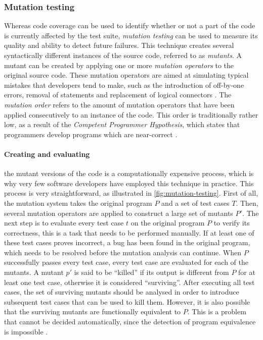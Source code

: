 \subsubsection{Mutation testing}
Whereas code coverage can be used to identify whether or not a part of the code is currently affected by the test suite, \emph{mutation testing} can be used to measure its quality and ability to detect future failures. This technique creates several syntactically different instances of the source code, referred to as \emph{mutants}. A mutant can be created by applying one or more \emph{mutation operators} to the original source code. These mutation operators are aimed at simulating typical mistakes that developers tend to make, such as the introduction of off-by-one errors, removal of statements and replacement of logical connectors \cite{Offutt2001}. The \emph{mutation order} refers to the amount of mutation operators that have been applied consecutively to an instance of the code. This order is traditionally rather low, as a result of the \emph{Competent Programmer Hypothesis}, which states that programmers develop programs which are near-correct \cite{5487526}.

\paragraph*{Creating and evaluating} the mutant versions of the code is a computationally expensive process, which is why very few software developers have employed this technique in practice. This process is very straightforward, as illustrated in \autoref{fig:mutation-testing}. First of all, the mutation system takes the original program $P$ and a set of test cases $T$. Then, several mutation operators are applied to construct a large set of mutants $P'$. The next step is to evaluate every test case $t$ on the original program $P$ to verify its correctness, this is a task that needs to be performed manually. If at least one of these test cases proves incorrect, a bug has been found in the original program, which needs to be resolved before the mutation analysis can continue. When $P$ successfully passes every test case, every test case are evaluated for each of the mutants. A mutant $p'$ is said to be ``killed'' if its output is different from $P$ for at least one test case, otherwise it is considered ``surviving''. After executing all test cases, the set of surviving mutants should be analysed in order to introduce subsequent test cases that can be used to kill them. However, it is also possible that the surviving mutants are functionally equivalent to $P$. This is a problem that cannot be decided automatically, since the detection of program equivalence is impossible \cite{5487526, Offutt2001}.

